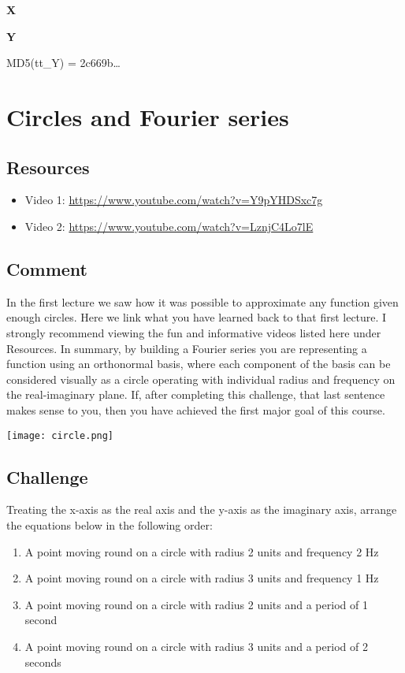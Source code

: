 \textbf{X}


\textbf{Y}

MD5(tt\_Y) = 2c669b\ldots

\timebox




\newpage
\section{Circles and Fourier series}

\subsection*{Resources}
\begin{itemize}
    \item Video 1: \url{https://www.youtube.com/watch?v=Y9pYHDSxc7g}
    \item Video 2: \url{https://www.youtube.com/watch?v=LznjC4Lo7lE}
\end{itemize}

\subsection*{Comment}
In the first lecture we saw how it was possible to approximate any function given enough circles. Here we link what you have learned back to that first lecture. I strongly recommend viewing the fun and informative videos listed here under Resources. In summary, by building a Fourier series you are representing a function using an orthonormal basis, where each component of the basis can be considered visually as a circle operating with individual radius and frequency on the real-imaginary plane. If, after completing this challenge, that last sentence makes sense to you, then you have achieved the first major goal of this course.

\texttt{[image: circle.png]}

\subsection*{Challenge}
Treating the x-axis as the real axis and the y-axis as the imaginary axis, arrange the equations below in the following order:

\begin{enumerate}
    \item A point moving round on a circle with radius 2 units and frequency 2 Hz
    \item A point moving round on a circle with radius 3 units and frequency 1 Hz
    \item A point moving round on a circle with radius 2 units and a period of 1 second
    \item A point moving round on a circle with radius 3 units and a period of 2 seconds
\end{enumerate}

